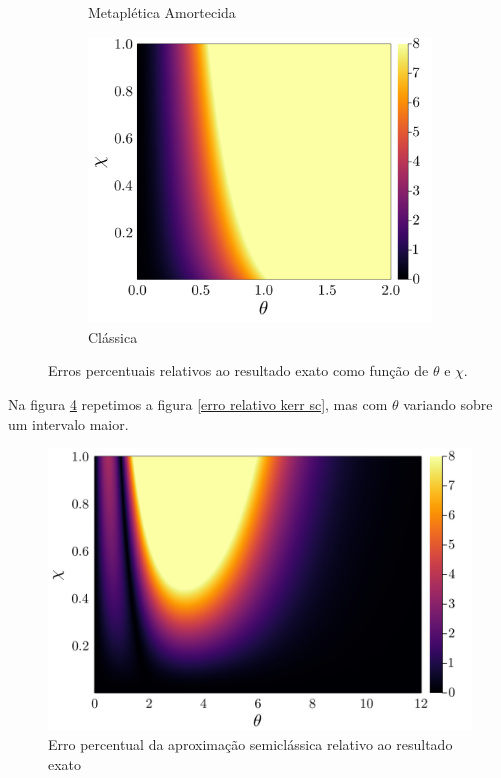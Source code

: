 \documentclass[
	12pt,
	oneside,			%
	a4paper,			%
	english,			%
	brazil				%
	]{abntex2}
\theoremstyle{definition}
\begin{document}
\begin{figure}[H]
\begin{subfigure}[b]{0.32\textwidth}
         \caption{Metaplética Amortecida}
         \label{fig:three sin x}
     \end{subfigure}
     \hfill
     \begin{subfigure}[b]{0.32\textwidth}
         \centering
         \includegraphics[width=\textwidth]{Imagens/erro_relativo_energia_cl.png}
         \caption{Clássica}
         \label{fig:five over x}
     \end{subfigure}
        \caption{Erros percentuais relativos ao resultado exato como função de $\theta$ e $\chi$.}
        \label{erros relativos kerr}
\end{figure}

Na figura \ref{erro relativo kerr extendido} repetimos a figura \ref{erro relativo kerr sc}, mas com $\theta$ variando sobre um intervalo maior.

\begin{figure}[H]
    \includegraphics[width=.8\textwidth]{Imagens/erro_relativo_energia_sc_extendido.png}
    \centering
    \caption{Erro percentual da aproximação semiclássica relativo ao resultado exato}
    \label{erro relativo kerr extendido}
\end{figure}
\end{document}
